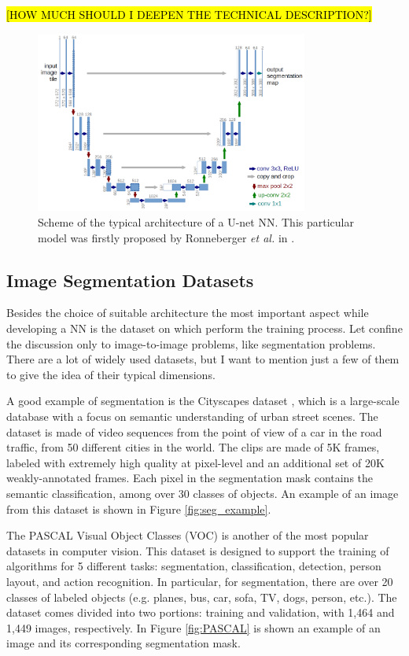 \hl{[HOW MUCH SHOULD I DEEPEN THE TECHNICAL DESCRIPTION?]}

    \begin{figure}
        \centering
        \includegraphics[width = 0.8\textwidth]{images/unet}
        \caption{Scheme of the typical architecture of a U-net NN. This particular model was firstly proposed by Ronneberger \textit{et al.} in \cite{U-net}.}
        \label{fig:unet}
    \end{figure}

\subsection{Image Segmentation Datasets}
Besides the choice of suitable architecture the most important aspect while developing a NN is the dataset on which perform the training process. Let confine the discussion only to image-to-image problems, like segmentation problems. There are a lot of widely used datasets, but I want to mention just a few of them to give the idea of their typical dimensions.

A good example of segmentation is the Cityscapes dataset \cite{Cityscapes}, which is a large-scale database with a focus on semantic understanding of urban street scenes. The dataset is made of video sequences from the point of view of a car in the road traffic, from 50 different cities in the world. The clips are made of 5K frames, labeled with extremely high quality at pixel-level and an additional set of 20K weakly-annotated frames. Each pixel in the segmentation mask contains the semantic classification, among over 30 classes of objects. An example of an image from this dataset is shown in Figure \ref{fig:seg_example}.

The PASCAL Visual Object Classes (VOC) \cite{PASCAL} is another of the most popular datasets in computer vision. This dataset is designed to support the training of algorithms for 5 different tasks: segmentation, classification, detection, person layout, and action recognition. In particular, for segmentation, there are over 20 classes of labeled objects (e.g. planes, bus, car, sofa, TV, dogs, person, etc.). The dataset comes divided into two portions: training and validation, with 1,464 and 1,449 images, respectively. In Figure \ref{fig:PASCAL} is shown an example of an image and its corresponding segmentation mask.

